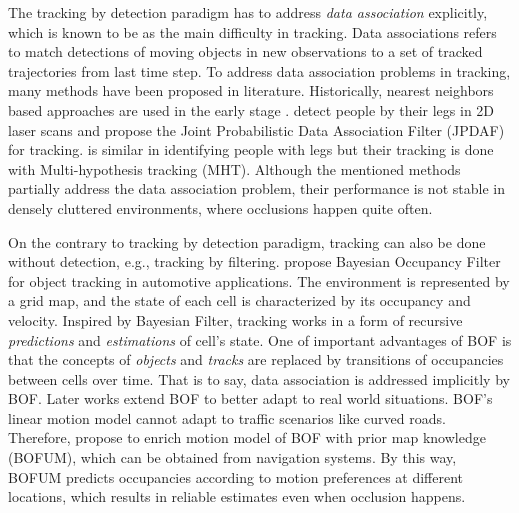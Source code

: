 The tracking by detection paradigm has to address \textit{data association} explicitly, which is known to be as the main difficulty in tracking. Data associations refers to match detections of moving objects in new observations to a set of tracked trajectories from last time step. To address data association problems in tracking, many methods have been proposed in literature. Historically, nearest neighbors based approaches are used in the early stage \citep{fod2002laser}. \citet{schulz2001tracking} detect people by their legs in 2D laser scans and propose the Joint Probabilistic Data Association Filter (JPDAF) for tracking. \citet{arras2008efficient} is similar in identifying people with legs but their tracking is done with Multi-hypothesis tracking (MHT). Although the mentioned methods partially address the data association problem, their performance is not stable in densely cluttered environments, where occlusions happen quite often.

On the contrary to tracking by detection paradigm, tracking can also be done without detection, e.g., tracking by filtering. \citet{coue2006bayesian} propose Bayesian Occupancy Filter for object tracking in automotive applications. The environment is represented by a grid map, and the state of each cell is characterized by its occupancy and velocity. Inspired by Bayesian Filter, tracking works in a form of recursive \textit{predictions} and \textit{estimations} of cell's state. One of important advantages of BOF is that the concepts of \textit{objects} and \textit{tracks} are replaced by transitions of occupancies between cells over time. That is to say, data association is addressed implicitly by BOF. Later works extend BOF to better adapt to real world situations. BOF's linear motion model cannot adapt to traffic scenarios like curved roads. Therefore, \citet{gindele2009bayesian} propose to enrich motion model of BOF with prior map knowledge (BOFUM), which can be obtained from navigation systems. By this way, BOFUM predicts occupancies according to motion preferences at different locations, which results in reliable estimates even when occlusion happens. 

